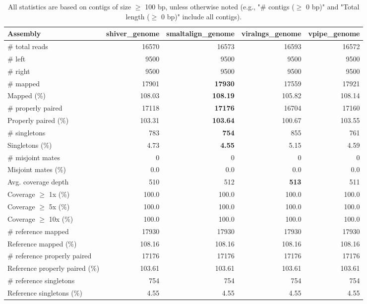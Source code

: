 \documentclass[12pt,a4paper]{article}
\begin{document}
\begin{table}[ht]
\begin{center}
\caption{All statistics are based on contigs of size $\geq$ 100 bp, unless otherwise noted (e.g., "\# contigs ($\geq$ 0 bp)" and "Total length ($\geq$ 0 bp)" include all contigs).}
\begin{tabular}{|l*{4}{|r}|}
\hline
Assembly & shiver\_genome & smaltalign\_genome & viralngs\_genome & vpipe\_genome \\ \hline
\# total reads & 16570 & 16573 & 16593 & 16572 \\ \hline
\# left & 9500 & 9500 & 9500 & 9500 \\ \hline
\# right & 9500 & 9500 & 9500 & 9500 \\ \hline
\# mapped & 17901 & {\bf 17930} & 17559 & 17921 \\ \hline
Mapped (\%) & 108.03 & {\bf 108.19} & 105.82 & 108.14 \\ \hline
\# properly paired & 17118 & {\bf 17176} & 16704 & 17160 \\ \hline
Properly paired (\%) & 103.31 & {\bf 103.64} & 100.67 & 103.55 \\ \hline
\# singletons & 783 & {\bf 754} & 855 & 761 \\ \hline
Singletons (\%) & 4.73 & {\bf 4.55} & 5.15 & 4.59 \\ \hline
\# misjoint mates & 0 & 0 & 0 & 0 \\ \hline
Misjoint mates (\%) & 0.0 & 0.0 & 0.0 & 0.0 \\ \hline
Avg. coverage depth & 510 & 512 & {\bf 513} & 511 \\ \hline
Coverage $\geq$ 1x (\%) & 100.0 & 100.0 & 100.0 & 100.0 \\ \hline
Coverage $\geq$ 5x (\%) & 100.0 & 100.0 & 100.0 & 100.0 \\ \hline
Coverage $\geq$ 10x (\%) & 100.0 & 100.0 & 100.0 & 100.0 \\ \hline
\# reference mapped & 17930 & 17930 & 17930 & 17930 \\ \hline
Reference mapped (\%) & 108.16 & 108.16 & 108.16 & 108.16 \\ \hline
\# reference properly paired & 17176 & 17176 & 17176 & 17176 \\ \hline
Reference properly paired (\%) & 103.61 & 103.61 & 103.61 & 103.61 \\ \hline
\# reference singletons & 754 & 754 & 754 & 754 \\ \hline
Reference singletons (\%) & 4.55 & 4.55 & 4.55 & 4.55 \\ \hline

\end{tabular}
\end{center}
\end{table}
\end{document}
